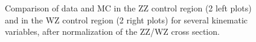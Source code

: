 \begin{figure}[h]
\noindent
{}
\caption{Comparison of data and MC in the ZZ control region (2 left
  plots) and in the WZ control region (2 right plots) for several kinematic variables, after normalization of the ZZ/WZ cross section.} 
\label{fig:validation}
\end{figure}

